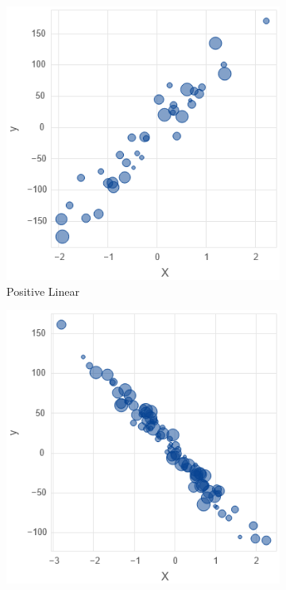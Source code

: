 \begin{figure}
    \centering
     \begin{subfigure}[b]{0.21\textwidth}
         \includegraphics[width=\textwidth]{figures/body/methodology/linear_pos_bubble.png}
         \caption{Positive Linear}
         \label{figure: pos_lin}
     \end{subfigure}
     \hfill
     \begin{subfigure}[b]{0.21\textwidth}
         \includegraphics[width=\textwidth]{figures/body/methodology/linear_neg_bubble.png}

\end{subfigure}
\end{figure}
